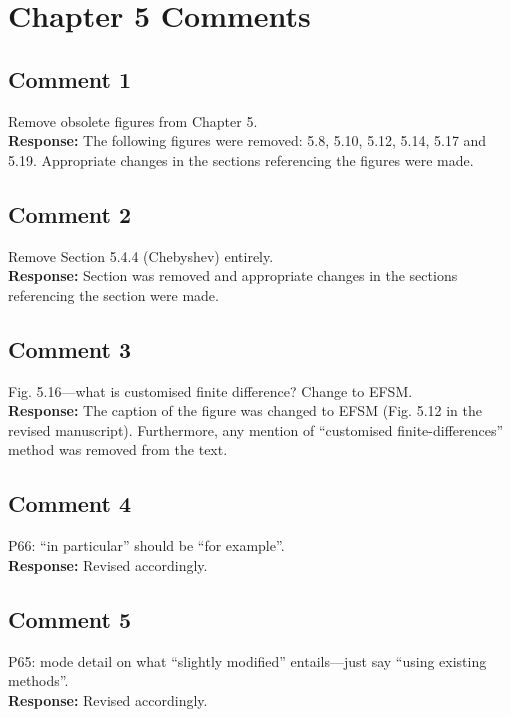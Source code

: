 \documentclass[10pt,a4paper,notitlepage]{article}
\numberwithin{equation}{section}
\begin{document}
\clearpage

\section{Chapter 5 Comments}
\subsection{Comment 1}
Remove obsolete figures from Chapter 5.\\[-2ex]

\textbf{Response:}
The following figures were removed: 5.8, 5.10, 5.12, 5.14, 5.17 and 5.19. Appropriate changes in the sections referencing the figures were made.

\subsection{Comment 2}
Remove Section 5.4.4 (Chebyshev) entirely.\\[-2ex]

\textbf{Response:}
Section was removed and appropriate changes in the sections referencing the section were made.

\subsection{Comment 3}
Fig. 5.16---what is customised finite difference? Change to EFSM.\\[-2ex]

\textbf{Response:}
The caption of the figure was changed to EFSM (Fig. 5.12 in the revised manuscript). Furthermore, any mention of ``customised finite-differences'' method was removed from the text.

\subsection{Comment 4}
P66: ``in particular'' should be ``for example''.\\[-2ex]

\textbf{Response:}
Revised accordingly.

\subsection{Comment 5}
P65: mode detail on what ``slightly modified'' entails---just say ``using existing methods''.\\[-2ex]

\textbf{Response:}
Revised accordingly.
\end{document}
